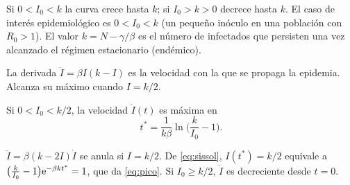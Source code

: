 \documentclass[11pt,twoside]{article}
\begin{document}
\begin{observacion}
Si $0<I_0<k$ la curva crece hasta $k$; si $I_0>k>0$ decrece hasta $k$. El caso de interés epidemiológico es $0<I_0<k$ (un
pequeño inóculo en una población con $R_0>1$). El valor $k=N-\gamma/\beta$ es el número de infectados que persisten una vez
alcanzado el régimen estacionario (endémico).
\end{observacion}

La derivada $\dot I=\beta I(k-I)$ es la velocidad con la que se propaga la epidemia. Alcanza su máximo cuando $I=k/2$.

\begin{proposicion}\label{prop:pico}
Si $0<I_0<k/2$, la velocidad $\dot I(t)$ es máxima en
\begin{equation}\label{eq:pico}
t^*=\frac1{k\beta}\ln\Big(\frac{k}{I_0}-1\Big).
\end{equation}
\end{proposicion}

\begin{demostracion}
$\ddot I=\beta(k-2I)\dot I$ se anula si $I=k/2$. De \eqref{eq:sissol}, $I(t^*)=k/2$ equivale a
$\big(\frac k{I_0}-1\big)\mathrm{e}^{-\beta kt^*}=1$, que da \eqref{eq:pico}. Si $I_0\ge k/2$, $\dot I$ es decreciente desde $t=0$.
\end{demostracion}
\end{document}
